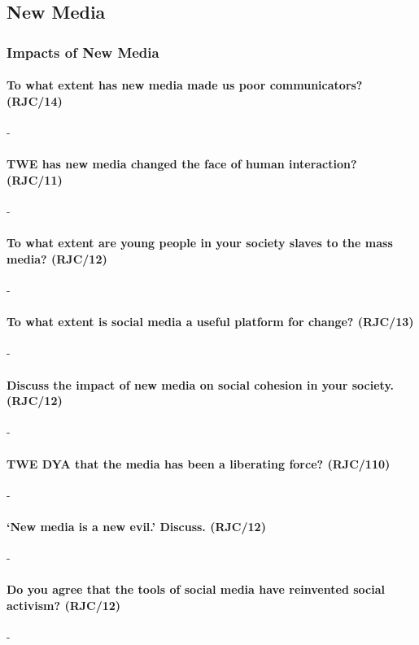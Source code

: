 \documentclass[../../main]{subfiles}
\begin{document}
\subsection{New Media}

\subsubsection{Impacts of New Media}

\paragraph{To what extent has new media made us poor communicators? (RJC/14)}-

\paragraph{TWE has new media changed the face of human interaction? (RJC/11)}-

\paragraph{To what extent are young people in your society slaves to the mass media? (RJC/12)}-


\paragraph{To what extent is social media a useful platform for change? (RJC/13)}-

\paragraph{Discuss the impact of new media on social cohesion in your society. (RJC/12)}-

\paragraph{TWE DYA that the media has been a liberating force? (RJC/110)}-


\paragraph{`New media is a new evil.' Discuss. (RJC/12)}-


\paragraph{Do you agree that the tools of social media have reinvented social activism? (RJC/12)}-
\end{document}
